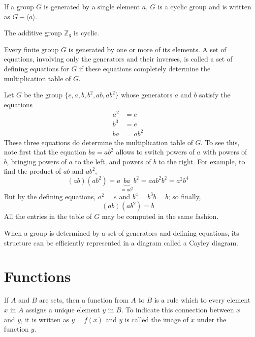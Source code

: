 \documentclass[12pt]{article}
\newcommand{\set}[1]{\{ #1 \}}
\newcommand{\integers}{\mathds{Z}}
\begin{document}
\begin{definition} If a group $G$ is generated by a single element $a$, $G$ is a cyclic group and is written as $G - \langle a \rangle$. \end{definition} 

\begin{example} The additive group $\integers_6$ is cyclic. \end{example} 

\begin{definition} Every finite group $G$ is generated by one or more of its elements. A set of equations, involving only the generators and their inverses, is called a set of defining equations for $G$ if these equations completely determine the multiplication table of $G$. \end{definition} 

\begin{example} Let $G$ be the group $\set{e, a, b, b^2, ab, ab^2}$ whose generators $a$ and $b$ satisfy the equations $$ \begin{aligned} a^2 &= e \\ b^3 &= e \\ ba &= ab^2 \end{aligned}$$ These three equations do determine the multiplication table of $G$. To see this, note first that the equation $ba = ab^2$ allows to switch powers of $a$ with powers of $b$, bringing powers of $a$ to the left, and powers of $b$ to the right. For example, to find the product of $ab$ and $ab^2$, $$(ab)(ab^2) = a\underbrace{ba}_{=ab^2}b^2 = aab^2b^2 = a^2b^4 $$ But by the defining equations, $a^2 = e$ and $b^4 = b^3b = b$; so finally, $$(ab)(ab^2) = b$$ All the entries in the table of $G$ may be computed in the same fashion. \end{example} 

\begin{definition} When a group is determined by a set of generators and defining equations, its structure can be efficiently represented in a diagram called a Cayley diagram. \end{definition} 

\section{Functions}

\begin{definition} If $A$ and $B$ are sets, then a function from $A$ to $B$ is a rule which to every element $x$ in $A$ assigns a unique element $y$ in $B$. To indicate this connection between $x$ and $y$, it is written as $y = f(x)$ and $y$ is called the image of $x$ under the function $y$. \end{definition} 
\end{document}
